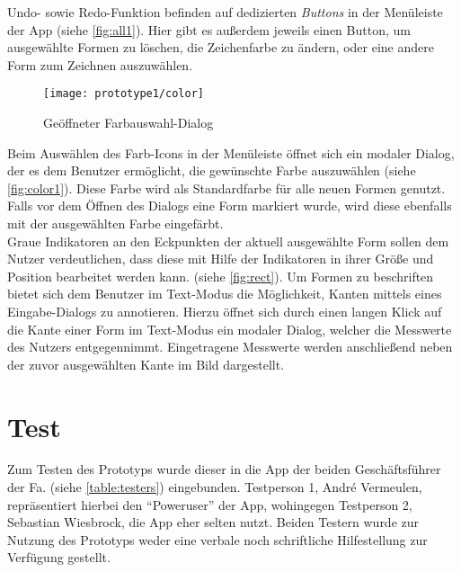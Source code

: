 Undo- sowie Redo-Funktion befinden auf dedizierten \emph{Buttons} in der Menüleiste der App (siehe \autoref{fig:all1}).
Hier gibt es außerdem jeweils einen Button, um ausgewählte Formen zu löschen, die Zeichenfarbe zu ändern, oder eine andere Form zum Zeichnen auszuwählen. \\

\begin{wrapfigure}{R}{0.4\textwidth}
  \centering
  \texttt{[image: prototype1/color]}
  \caption{Geöffneter Farbauswahl-Dialog}
  \label{fig:color1}
\end{wrapfigure}

Beim Auswählen des Farb-Icons in der Menüleiste öffnet sich ein modaler Dialog, der es dem Benutzer ermöglicht, die gewünschte Farbe auszuwählen (siehe \autoref{fig:color1}).
Diese Farbe wird als Standardfarbe für alle neuen Formen genutzt.
Falls vor dem Öffnen des Dialogs eine Form markiert wurde, wird diese ebenfalls mit der ausgewählten Farbe eingefärbt. \\

Graue Indikatoren an den Eckpunkten der aktuell ausgewählte Form sollen dem Nutzer verdeutlichen, dass diese mit Hilfe der Indikatoren in ihrer Größe und Position bearbeitet werden kann. (siehe \autoref{fig:rect}).
Um Formen zu beschriften bietet sich dem Benutzer im Text-Modus die Möglichkeit, Kanten mittels eines Eingabe-Dialogs zu annotieren.
Hierzu öffnet sich durch einen langen Klick auf die Kante einer Form im Text-Modus ein modaler Dialog, welcher die Messwerte des Nutzers entgegennimmt.
Eingetragene Messwerte werden anschließend neben der zuvor ausgewählten Kante im Bild dargestellt. 


\section{Test}\label{sec:test1}
Zum Testen des Prototyps wurde dieser in die App der beiden Geschäftsführer der Fa. \vr{} (siehe \autoref{table:testers}) eingebunden.
Testperson 1, André Vermeulen, repräsentiert hierbei den ``Poweruser'' der App, wohingegen Testperson 2, Sebastian Wiesbrock, die App eher selten nutzt.
Beiden Testern wurde zur Nutzung des Prototyps weder eine verbale noch schriftliche Hilfestellung zur Verfügung gestellt.

